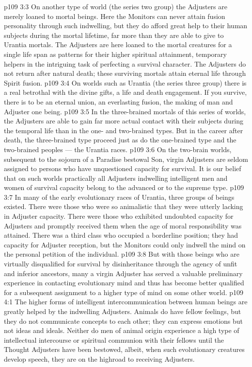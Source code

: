 \vs p109 3:3 On another type of world (the series two group) the Adjusters are merely loaned to mortal beings. Here the Monitors can never attain fusion personality through such indwelling, but they do afford great help to their human subjects during the mortal lifetime, far more than they are able to give to Urantia mortals. The Adjusters are here loaned to the mortal creatures for a single life span as patterns for their higher spiritual attainment, temporary helpers in the intriguing task of perfecting a survival character. The Adjusters do not return after natural death; these surviving mortals attain eternal life through Spirit fusion.
\vs p109 3:4 On worlds such as Urantia (the series three group) there is a real betrothal with the divine gifts, a life and death engagement. If you survive, there is to be an eternal union, an everlasting fusion, the making of man and Adjuster one being.
\vs p109 3:5 In the three\hyp{}brained mortals of this series of worlds, the Adjusters are able to gain far more actual contact with their subjects during the temporal life than in the one\hyp{} and two\hyp{}brained types. But in the career after death, the three\hyp{}brained type proceed just as do the one\hyp{}brained type and the two\hyp{}brained peoples --- the Urantia races.
\vs p109 3:6 On the two\hyp{}brain worlds, subsequent to the sojourn of a Paradise bestowal Son, virgin Adjusters are seldom assigned to persons who have unquestioned capacity for survival. It is our belief that on such worlds practically all Adjusters indwelling intelligent men and women of survival capacity belong to the advanced or to the supreme type.
\vs p109 3:7 \pc In many of the early evolutionary races of Urantia, three groups of beings existed. There were those who were so animalistic that they were utterly lacking in Adjuster capacity. There were those who exhibited undoubted capacity for Adjusters and promptly received them when the age of moral responsibility was attained. There was a third class who occupied a borderline position; they had capacity for Adjuster reception, but the Monitors could only indwell the mind on the personal petition of the individual.
\vs p109 3:8 But with those beings who are virtually disqualified for survival by disinheritance through the agency of unfit and inferior ancestors, many a virgin Adjuster has served a valuable preliminary experience in contacting evolutionary mind and thus has become better qualified for a subsequent assignment to a higher type of mind on some other world.
\vs p109 4:1 The higher forms of intelligent intercommunication between human beings are greatly helped by the indwelling Adjusters. Animals do have fellow feelings, but they do not communicate concepts to each other; they can express emotions but not ideas and ideals. Neither do men of animal origin experience a high type of intellectual intercourse or spiritual communion with their fellows until the Thought Adjusters have been bestowed, albeit, when such evolutionary creatures develop speech, they are on the highroad to receiving Adjusters.

